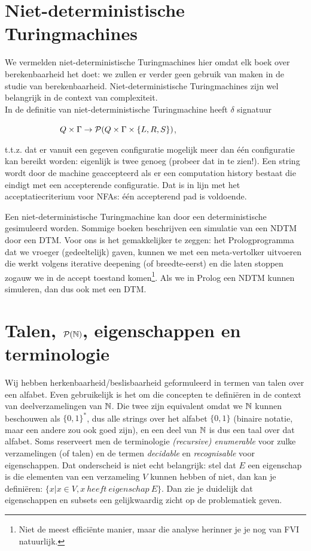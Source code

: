 \section{Niet-deterministische Turingmachines}

We vermelden niet-deterministische Turingmachines hier omdat elk
boek over berekenbaarheid het doet: we zullen er verder geen gebruik
van maken in de studie van berekenbaarheid. Niet-deterministische
Turingmachines zijn wel belangrijk in de context van complexiteit.
\\

In de definitie van niet-deterministische Turingmachine heeft
$\delta$ signatuur 

~~~~~~~~~~~~~$Q \times \Gamma \rightarrow {\cal P}(Q \times \Gamma
\times \{L,R,S\})$,

t.t.z. dat er vanuit een gegeven
configuratie mogelijk meer dan \'{e}\'{e}n configuratie kan bereikt
worden: eigenlijk is twee genoeg (probeer dat in te zien!). Een string
wordt door de machine geaccepteerd als er een computation history
bestaat die eindigt met een accepterende configuratie.  Dat is in lijn
met het acceptatiecriterium voor NFAs: \'{e}\'{e}n accepterend pad is
voldoende.

Een niet-deterministische Turingmachine kan door een deterministische
gesimuleerd worden. Sommige boeken beschrijven een simulatie van een
NDTM door een DTM. Voor ons is het gemakkelijker te zeggen: het
Prologprogramma dat we vroeger (gedeeltelijk) gaven, kunnen we met een
meta-vertolker uitvoeren die werkt volgens iterative deepening (of
breedte-eerst) en die laten stoppen zogauw we in de accept toestand
komen\footnote{Niet de meest effici\"ente manier, maar die analyse
herinner je je nog van FVI natuurlijk.}. Als we in Prolog een NDTM
kunnen simuleren, dan dus ook met een DTM.


\section{Talen, ${\cal P}(\mathbb{N})$, eigenschappen en terminologie}

Wij hebben herkenbaarheid/beslisbaarheid geformuleerd in termen van
talen over een alfabet. Even gebruikelijk is het om die concepten te
defini\"eren in de context van deelverzamelingen van $\mathbb{N}$. Die twee zijn
equivalent omdat we $\mathbb{N}$ kunnen beschouwen als $\{0,1\}^*$, dus alle
strings over het alfabet $\{0,1\}$ (binaire notatie, maar een andere
zou ook goed zijn), en een deel van $\mathbb{N}$ is dus een taal over dat
alfabet. Soms reserveert men de terminologie {\em (recursive)
enumerable} voor zulke verzamelingen (of talen) en de termen {\em
decidable} en {\em recognisable} voor eigenschappen. Dat
onderscheid is niet echt belangrijk: stel dat $E$ een eigenschap is
die elementen van een verzameling $V$ kunnen hebben of niet, dan kan
je defini\"eren: $\{x | x \in V, x~heeft~eigenschap~E\}$. Dan zie je
duidelijk dat eigenschappen en subsets een gelijkwaardig zicht op de
problematiek geven.



